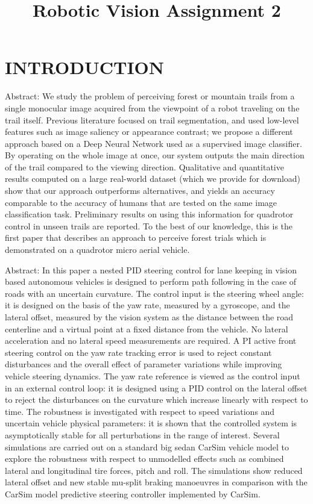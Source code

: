 \documentclass[letterpaper, 10 pt, conference]{ieeeconf}  %
\title{\LARGE \bf
Robotic Vision Assignment 2
}
\begin{document}
\maketitle
\thispagestyle{empty}
\pagestyle{empty}

\section{INTRODUCTION}

Abstract: 
    We study the problem of perceiving forest or mountain trails from a single monocular image acquired from the viewpoint of a robot traveling on the trail itself. Previous literature focused on trail segmentation, and used low-level features such as image saliency or appearance contrast; we propose a different approach based on a Deep Neural Network used as a supervised image classifier. By operating on the whole image at once, our system outputs the main direction of the trail compared to the viewing direction. Qualitative and quantitative results computed on a large real-world dataset (which we provide for download) show that our approach outperforms alternatives, and yields an accuracy comparable to the accuracy of humans that are tested on the same image classification task. Preliminary results on using this information for quadrotor control in unseen trails are reported. To the best of our knowledge, this is the first paper that describes an approach to perceive forest trials which is demonstrated on a quadrotor micro aerial vehicle.\cite{giusti2016machine}

Abstract:
    In this paper a nested PID steering control for lane keeping in vision based autonomous vehicles is designed to perform path following in the case of roads with an uncertain curvature. The control input is the steering wheel angle: it is designed on the basis of the yaw rate, measured by a gyroscope, and the lateral offset, measured by the vision system as the distance between the road centerline and a virtual point at a fixed distance from the vehicle. No lateral acceleration and no lateral speed measurements are required. A PI active front steering control on the yaw rate tracking error is used to reject constant disturbances and the overall effect of parameter variations while improving vehicle steering dynamics. The yaw rate reference is viewed as the control input in an external control loop: it is designed using a PID control on the lateral offset to reject the disturbances on the curvature which increase linearly with respect to time. The robustness is investigated with respect to speed variations and uncertain vehicle physical parameters: it is shown that the controlled system is asymptotically stable for all perturbations in the range of interest. Several simulations are carried out on a standard big sedan CarSim vehicle model to explore the robustness with respect to unmodelled effects such as combined lateral and longitudinal tire forces, pitch and roll. The simulations show reduced lateral offset and new stable mu-split braking manoeuvres in comparison with the CarSim model predictive steering controller implemented by CarSim.\cite{5160343}
\end{document}
